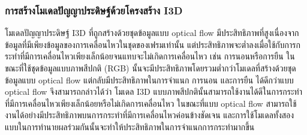 \subsubsection{การสร้างโมเดลปัญญาประดิษฐ์ด้วยโครงสร้าง I3D}
โมเดลปัญญาประดิษฐ์ I3D ที่ถูกสร้างด้วยชุดข้อมูลแบบ optical flow มีประสิทธิภาพที่สูงเนื่องจากข้อมูลที่มีเพียงข้อมูลของการเคลื่อนไหวในชุดของเฟรมเท่านั้น 
แต่ประสิทธิภาพจะต่ำลงเมื่อใช้กับการกระทำที่มีการเคลื่อนไหวเพียงเล็กน้อยจนแทบจะไม่เกิดการเคลื่อนไหว เช่น การนอนหรือการยืน ในขณะที่ใช้ชุดข้อมูลแบบภาพสีปกติ (RGB) 
นั้นจะมีประสิทธิภาพโดยรวมต่ำกว่าโมเดลที่สร้างด้วยชุดข้อมูลแบบ optical flow แต่กลับมีประสิทธิภาพในการจำแนก การนอน และการยืน ได้ดีกว่าแบบ optical flow
จึงสามารถกล่าวได้ว่า โมเดล I3D แบบภาพสีปกตินั้นสามารถใช้งานได้ดีในการกระทำที่มีการเคลื่อนไหวเพียงเล็กน้อยหรือไม่เกิดการเคลื่อนไหว ในขณะที่แบบ optical flow 
สามารถใช้งานได้อย่างมีประสิทธิภาพบนการกระทำที่มีการเคลื่อนไหวค่อนข้างชัดเจน และการใช้โมเดลทั้งสองแบบในการทำนายผลร่วมกันนั้นจะทำให้ประสิทธิภาพในการจำแนกการกระทำมากขึ้น
